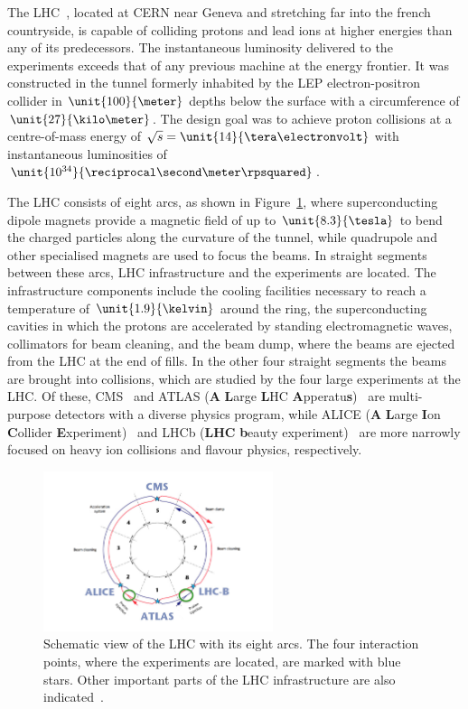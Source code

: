 \label{sec:LHC}
The LHC~\cite{LHC}, located at CERN near Geneva and stretching far into the french countryside, is capable of colliding protons and lead ions at higher energies than any of its predecessors. The instantaneous luminosity delivered to the experiments exceeds that of any previous machine at the energy frontier. It was constructed in the tunnel formerly inhabited by the LEP electron-positron collider in $\unit{100}{\meter}$ depths below the surface with a circumference of $\unit{27}{\kilo\meter}$. The design goal was to achieve proton collisions at a centre-of-mass energy of $\sqrt{s} = \unit{14}{\tera\electronvolt}$ with instantaneous luminosities of $\unit{10^{34}}{\reciprocal\second\meter\rpsquared}$. 

The LHC consists of eight arcs, as shown in Figure~\ref{fig:LHC}, where superconducting dipole magnets provide a magnetic field of up to $\unit{8.3}{\tesla}$ to bend the charged particles along the curvature of the tunnel, while quadrupole and other specialised magnets are used to focus the beams. In straight segments between these arcs, LHC infrastructure and the experiments are located. The infrastructure components include the cooling facilities necessary to reach a temperature of $\unit{1.9}{\kelvin}$ around the ring, the superconducting cavities in which the protons are accelerated by standing electromagnetic waves, collimators for beam cleaning, and the beam dump, where the beams are ejected from the LHC at the end of fills. In the other four straight segments the beams are brought into collisions, which are studied by the four large experiments at the LHC. Of these, CMS~\cite{CMS} and ATLAS (\textbf{A} \textbf{L}arge \textbf{L}HC \textbf{A}pperatu\textbf{s})~\cite{ATLAS} are multi-purpose detectors with a diverse physics program, while ALICE (\textbf{A} \textbf{L}arge \textbf{I}on \textbf{C}ollider \textbf{E}xperiment)~\cite{ALICE} and LHCb (\textbf{LHC} \textbf{b}eauty experiment)~\cite{LHCb} are more narrowly focused on heavy ion collisions and flavour physics, respectively. 

\begin{figure}[htbp]
\centering
  \includegraphics[width=0.6\textwidth]{plots/LHC/LHC_scetch.png}
\caption{Schematic view of the LHC with its eight arcs. The four interaction points, where the experiments are located, are marked with blue stars. Other important parts of the LHC infrastructure are also indicated~\cite{LHCScetch}.}
\label{fig:LHC}
\end{figure}

